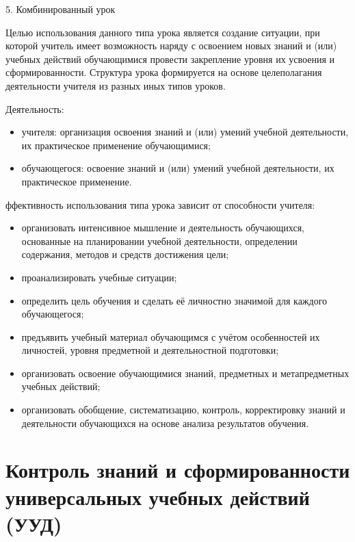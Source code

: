 \documentclass[
  11pt,
  russian,
]{book}
\begin{document}
5. Комбинированный урок

Целью использования данного типа урока является создание ситуации, при
которой учитель имеет возможность наряду с освоением новых знаний и
(или) учебных действий обучающимися провести закрепление уровня их
усвоения и сформированности. Структура урока формируется на основе
целеполагания деятельности учителя из разных иных типов уроков.

Деятельность:

\begin{itemize}
\item
  учителя: организация освоения знаний и (или) умений учебной
  деятельности, их практическое применение обучающимися;
\item
  обучающегося: освоение знаний и (или) умений учебной деятельности, их
  практическое применение.
\end{itemize}

ффективность использования типа урока зависит от способности учителя:

\begin{itemize}
\item
  организовать интенсивное мышление и деятельность обучающихся,
  основанные на планировании учебной деятельности, определении
  содержания, методов и средств достижения цели;
\item
  проанализировать учебные ситуации;
\item
  определить цель обучения и сделать её личностно значимой для каждого
  обучающегося;
\item
  предъявить учебный материал обучающимся с учётом особенностей их
  личностей, уровня предметной и деятельностной подготовки;
\item
  организовать освоение обучающимися знаний, предметных и метапредметных
  учебных действий;
\item
  организовать обобщение, систематизацию, контроль, корректировку знаний
  и деятельности обучающихся на основе анализа результатов обучения.
\end{itemize}

\hypertarget{ux43aux43eux43dux442ux440ux43eux43bux44c-ux437ux43dux430ux43dux438ux439-ux438-ux441ux444ux43eux440ux43cux438ux440ux43eux432ux430ux43dux43dux43eux441ux442ux438-ux443ux43dux438ux432ux435ux440ux441ux430ux43bux44cux43dux44bux445-ux443ux447ux435ux431ux43dux44bux445-ux434ux435ux439ux441ux442ux432ux438ux439-ux443ux443ux434}{%
\section*{Контроль знаний и сформированности универсальных учебных
действий
(УУД)}\label{ux43aux43eux43dux442ux440ux43eux43bux44c-ux437ux43dux430ux43dux438ux439-ux438-ux441ux444ux43eux440ux43cux438ux440ux43eux432ux430ux43dux43dux43eux441ux442ux438-ux443ux43dux438ux432ux435ux440ux441ux430ux43bux44cux43dux44bux445-ux443ux447ux435ux431ux43dux44bux445-ux434ux435ux439ux441ux442ux432ux438ux439-ux443ux443ux434}}
\end{document}
